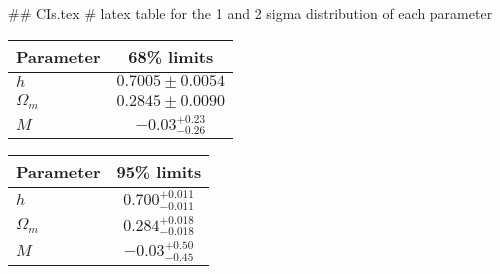 ## CIs.tex
# latex table for the 1 and 2 sigma distribution of each parameter

\begin{tabular} { l  c}
 Parameter &  68\% limits\\
\hline
{\boldmath$h              $} & $0.7005\pm 0.0054          $\\
{\boldmath$\Omega_m       $} & $0.2845\pm 0.0090          $\\
{\boldmath$M              $} & $-0.03^{+0.23}_{-0.26}     $\\
\hline
\end{tabular}

\begin{tabular} { l  c}
 Parameter &  95\% limits\\
\hline
{\boldmath$h              $} & $0.700^{+0.011}_{-0.011}   $\\
{\boldmath$\Omega_m       $} & $0.284^{+0.018}_{-0.018}   $\\
{\boldmath$M              $} & $-0.03^{+0.50}_{-0.45}     $\\
\hline
\end{tabular}
